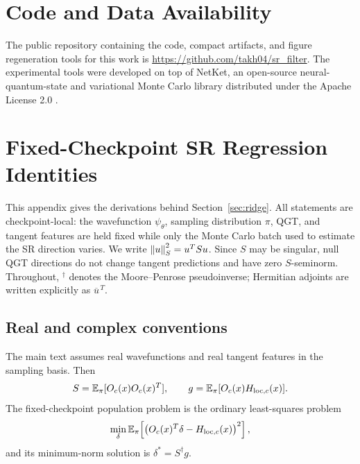 \section{Code and Data Availability}\label{app:code}
The public repository containing the code, compact artifacts, and figure
regeneration tools for this work is
\url{https://github.com/takh04/sr_filter}.
The experimental tools were developed on top of NetKet, an open-source
neural-quantum-state and variational Monte Carlo library distributed under the
Apache License 2.0 \citep{vicentini2022netket}.

\section{Fixed-Checkpoint SR Regression Identities}\label{app:proofs}

This appendix gives the derivations behind Section~\ref{sec:ridge}. All
statements are checkpoint-local: the wavefunction \(\psi_\theta\), sampling
distribution \(\pi\), QGT, and tangent features are held fixed while only the
Monte Carlo batch used to estimate the SR direction varies. We write
\(\left\| u \right\|_S^2=u^T S u\). Since \(S\) may be singular, null QGT directions do not
change tangent predictions and have zero \(S\)-seminorm. Throughout,
\(^{\dagger}\) denotes the Moore--Penrose pseudoinverse; Hermitian adjoints are
written explicitly as \(\overline{u}^{\,T}\).

\subsection{Real and complex conventions}

The main text assumes real wavefunctions and real tangent features in the
sampling basis. Then
\[
    S=\mathbb{E}_\pi[O_c(x)O_c(x)^T],
    \qquad
    g=\mathbb{E}_\pi[O_c(x)H_{\mathrm{loc},c}(x)] .
\]
The fixed-checkpoint population problem is the ordinary least-squares problem
\[
    \min_\delta
    \mathbb{E}_\pi\!\left[
        \left(O_c(x)^T\delta-H_{\mathrm{loc},c}(x)\right)^2
    \right],
\]
and its minimum-norm solution is \(\delta^*=S^\dagger g\).

